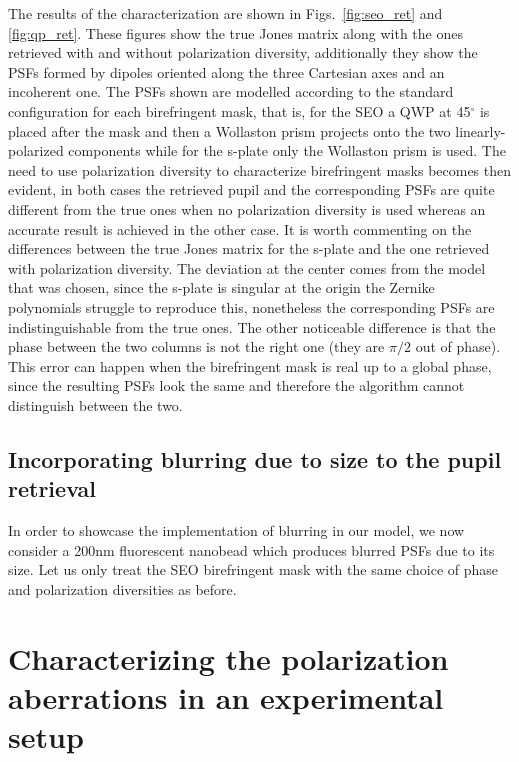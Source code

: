 \documentclass[reprint,aps,pra,superscriptaddress,
amsmath,amssymb]{revtex4-1}
\begin{document}
The results of the characterization are shown in Figs.~\ref{fig:seo_ret} 
and \ref{fig:qp_ret}. These figures show the true Jones matrix along with the
ones retrieved with and without polarization diversity, additionally they show the
PSFs formed by dipoles oriented along the three Cartesian axes and an incoherent one. 
The PSFs shown are modelled according to the standard configuration for each 
birefringent mask, that is, for the SEO a QWP at 45${}^\circ$ is placed after the mask 
and then a Wollaston prism projects onto the two linearly-polarized components while 
for the s-plate only the Wollaston prism is used. The need to use polarization diversity
to characterize birefringent masks becomes then evident, in both cases the retrieved
pupil and the corresponding PSFs are quite different from the true ones when no
polarization diversity is used whereas an accurate result is achieved in the other case.
It is worth commenting on the differences between the true Jones matrix for the s-plate 
and the one retrieved with polarization diversity. The deviation at the center comes 
from the model that was chosen, since the s-plate is singular at the origin the Zernike
polynomials struggle to reproduce this, nonetheless the corresponding PSFs are 
indistinguishable from the true ones. The other noticeable difference is that the phase
between the two columns is not the right one (they are $\pi/2$ out of phase). 
This error can happen when the birefringent mask is real up to a global phase, since the
resulting PSFs look the same and therefore the algorithm cannot distinguish between the 
two.


\subsection{Incorporating blurring due to size to the pupil retrieval}

In order to showcase the implementation of blurring in our model, we now consider a 
200nm fluorescent nanobead which produces blurred PSFs due to its size. Let us only treat 
the SEO birefringent mask with the same choice of phase and polarization 
diversities as before.


\section{Characterizing the polarization aberrations in an experimental
setup}
\end{document}
